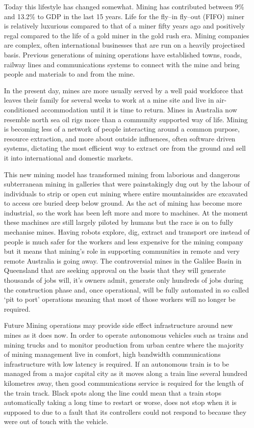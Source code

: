 Today this lifestyle has changed somewhat. Mining has contributed between 9\% and 13.2\% to GDP in the last 15 years\cite{RefWorks:277}. Life for the fly--in fly--out (FIFO) miner is relatively luxurious compared to that of a miner fifty years ago and positively regal compared to the life of a gold miner in the gold rush era. Mining companies are complex, often international businesses that are run on a heavily projectised basis. Previous generations of mining operations have established towns, roads, railway lines and communications systems to connect with the mine and bring people and materials to and from the mine. 

In the present day, mines are more usually served by a well paid workforce that leaves their family for several weeks to work at a mine site and live in air-conditioned accommodation until it is time to return. Mines in Australia now resemble north sea oil rigs more than a community supported way of life. Mining is becoming less of a network of people interacting around a common purpose, resource extraction, and more about outside influences, often software driven systems, dictating the most efficient way to extract ore from the ground and sell it into international and domestic markets.

This new mining model has transformed mining from laborious and dangerous subterranean mining in galleries that were painstakingly dug out by the labour of individuals to strip or open cut mining where entire mountainsides are excavated to access ore buried deep below ground. As the act of mining has become more industrial, so the work has been left more and more to machines. At the moment these machines are still largely piloted by humans but the race is on to fully mechanise mines. Having robots explore, dig, extract and transport ore instead of people is much safer for the workers and less expensive for the mining company but it means that mining's role in supporting communities in remote and very remote Australia is going away. The controversial mines in the Galilee Basin in Queensland that are seeking approval on the basis that they will generate thousands of jobs will, it's owners admit, generate only hundreds of jobs during the construction phase and, once operational, will be fully automated in so called `pit to port'\cite{Long2018} operations meaning that most of those workers will no longer be required.

Future Mining operations may provide side effect infrastructure around new mines as it does now.  In order to operate autonomous vehicles such as trains and mining trucks and to monitor production from urban centre where the majority of mining management live in comfort, high bandwidth communications infrastructure with low latency is required. If an autonomous train is to be managed from a major capital city as it moves along a train line several hundred kilometres away, then good communications service is required for the length of the train track. Black spots along the line could mean that a train stops automatically taking a long time to restart or worse, does not stop when it is supposed to due to a fault that its controllers could not respond to because they were out of touch with the vehicle.

